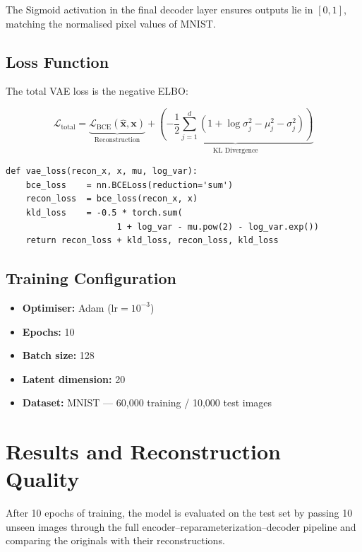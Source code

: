 \documentclass[12pt,a4paper]{article}
\begin{document}
The Sigmoid activation in the final decoder layer ensures outputs lie in $[0,1]$, matching the normalised pixel values of MNIST.

\subsection{Loss Function}

The total VAE loss is the negative ELBO:

\begin{equation}
    \mathcal{L}_{\text{total}} = \underbrace{\mathcal{L}_{\text{BCE}}(\hat{\mathbf{x}}, \mathbf{x})}_{\text{Reconstruction}} + \underbrace{\left(-\frac{1}{2}\sum_{j=1}^{d}\left(1 + \log\sigma_j^2 - \mu_j^2 - \sigma_j^2\right)\right)}_{\text{KL Divergence}}
\end{equation}

\begin{lstlisting}[style=pythonstyle, caption={VAE Loss Function}]
def vae_loss(recon_x, x, mu, log_var):
    bce_loss    = nn.BCELoss(reduction='sum')
    recon_loss  = bce_loss(recon_x, x)
    kld_loss    = -0.5 * torch.sum(
                      1 + log_var - mu.pow(2) - log_var.exp())
    return recon_loss + kld_loss, recon_loss, kld_loss
\end{lstlisting}

\subsection{Training Configuration}

\begin{itemize}
    \item \textbf{Optimiser:} Adam ($\text{lr} = 10^{-3}$)
    \item \textbf{Epochs:} 10
    \item \textbf{Batch size:} 128
    \item \textbf{Latent dimension:} 20
    \item \textbf{Dataset:} MNIST — 60,000 training / 10,000 test images
\end{itemize}

\section{Results and Reconstruction Quality}

After 10 epochs of training, the model is evaluated on the test set by passing 10 unseen images through the full encoder–reparameterization–decoder pipeline and comparing the originals with their reconstructions.
\end{document}
